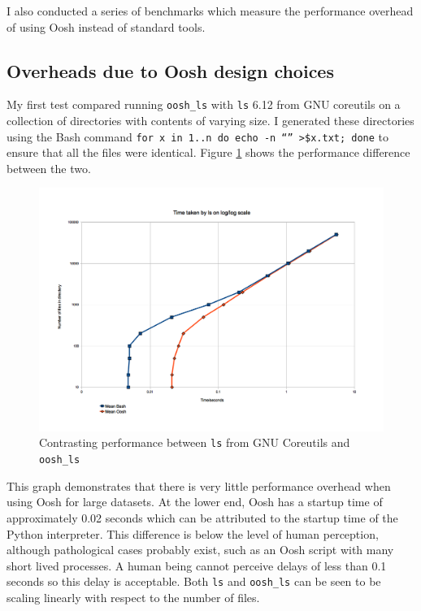 \documentclass[12pt,twoside,notitlepage]{report}
\begin{document}
I also conducted a series of benchmarks which measure the performance
overhead of using Oosh instead of standard tools.

\subsection{Overheads due to Oosh design choices}
My first test compared running {\tt oosh\_ls} with {\tt ls} 6.12 from
GNU coreutils on a collection of directories with contents of varying
size. I generated these directories using the Bash command {\tt for x
  in {1..n} do echo -n ``'' >\$x.txt; done} to ensure that all the
files were identical. Figure \ref{lsspeed} shows the performance
difference between the two.

\begin{figure}[h]
\label{lsspeed}
\centering
\caption{Contrasting performance between {\tt ls} from GNU Coreutils
  and {\tt oosh\_ls}}
\includegraphics[scale=0.5]{ls_graph.png}
\end{figure}

This graph demonstrates that there is very little performance overhead
when using Oosh for large datasets. At the lower end, Oosh has a
startup time of approximately 0.02 seconds which can be attributed to
the startup time of the Python interpreter. This difference is below
the level of human perception, although pathological cases probably
exist, such as an Oosh script with many short lived processes. A human
being cannot perceive delays of less than 0.1 seconds 
so this delay is acceptable. Both {\tt ls} and {\tt oosh\_ls} can be
seen to be scaling linearly with respect to the number of files.
\end{document}
